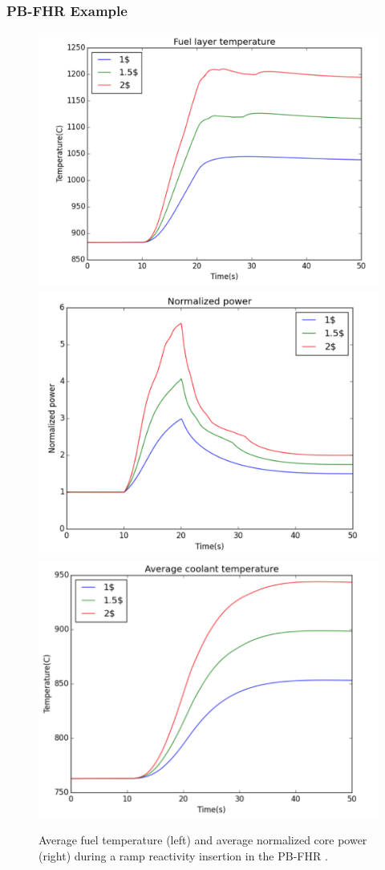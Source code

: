 \begin{frame}
        \frametitle{PB-FHR Example}

               \begin{figure}[t]
                \vspace*{-0.1in}
                       \hspace*{-0.3in}
                       \includegraphics[height=0.3\textwidth]{./images/pbfhr-fuel-temp.png}
                       \includegraphics[height=0.3\textwidth]{./images/pbfhr-avg-pow.png}
                       \includegraphics[height=0.3\textwidth]{./images/pbfhr-coolant-temp.png}
                       \caption{Average fuel temperature (left) and average 
                       normalized core power (right) during a ramp reactivity 
                       insertion in the PB-FHR \cite{wang_coupled_2016}.}
               \end{figure}

\end{frame}


